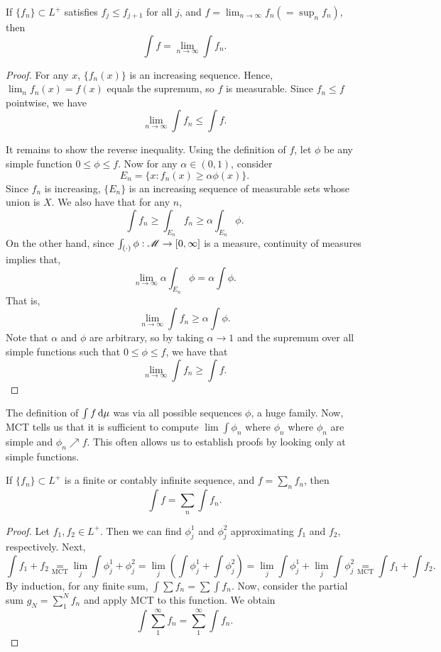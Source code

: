 \documentclass[12pt]{article} %
\begin{document}
\begin{theorem}
    If $\{f_n\} \subset L^+$ satisfies $f_j \leq f_{j+1}$ for all $j$, and $f = \lim_{n \to \infty} f_n (= \sup_n f_n)$, then \[\int f = \lim_{n \to \infty} \int f_n.\]
\end{theorem}

\begin{proof}
    For any $x$, $\{f_n(x)\}$ is an increasing sequence. Hence, $\lim_n f_n(x) = f(x)$ equals the supremum, so $f$ is measurable. Since $f_n \leq f$ pointwise, we have \[\lim_{n \to \infty} \int f_n \leq \int f.\]

    It remains to show the reverse inequality. Using the definition of $f$, let $\phi$ be any simple function $0 \leq \phi \leq f$. Now for any $\alpha \in (0,1)$, consider \[E_n = \{x : f_n(x) \geq \alpha \phi(x)\} .\] Since $f_n$ is increasing, $\{E_n\}$ is an increasing sequence of measurable sets whose union is $X$. We also have that for any $n$, \[\int f_n \geq \int_{E_n} f_n \geq \alpha \int_{E_n} \phi.\] On the other hand, since $\int_{(\cdot)}\phi : \mathscr{M} \to [0,\infty]$ is a measure, continuity of measures implies that, \[\lim_{n \to \infty} \alpha \int_{E_n} \phi = \alpha \int \phi.\] That is, \[\lim_{n \to \infty} \int f_n \geq \alpha \int \phi.\] Note that $\alpha$ and $\phi$ are arbitrary, so by taking $\alpha \to 1$ and the supremum over all simple functions such that $0 \leq \phi \leq f$, we have that \[\lim_{n \to \infty} \int f_n \geq \int f.\]
\end{proof}

\begin{remark}
    The definition of $\int f \, \mathrm{d} \mu$ was via all possible sequences $\phi$, a huge family. Now, MCT tells us that it is sufficient to compute $\lim \int \phi_n$ where $\phi_n$ where $\phi_n$ are simple and $\phi_n \nearrow f$. This often allows us to establish proofs by looking only at simple functions.
\end{remark}

\begin{theorem}\label{thm:2.15}
    If $\{f_n\} \subset L^+$ is a finite or contably infinite sequence, and $f = \sum_n f_n$, then \[\int f = \sum_n \int f_n.\]
\end{theorem}

\begin{proof}
    Let $f_1, f_2 \in L^+$. Then we can find $\phi_j^1$ and $\phi_j^2$ approximating $f_1$ and $f_2$, respectively. Next, \[\int f_1 + f_2 \underset{\text{MCT}}{=} \lim_j \int \phi_j^1 + \phi_j^2 = \lim_j \left( \int \phi_j^1 + \int \phi_j^2 \right) = \lim_j \int \phi_j^1 + \lim_j \int \phi_j^2 \underset{\text{MCT}}{=} \int f_1 + \int f_2.\] By induction, for any finite sum, $\int \sum f_n = \sum \int f_n$. Now, consider the partial sum $g_N = \sum_1^N f_n$ and apply MCT to this function. We obtain \[\int \sum_1^\infty f_n = \sum_1^\infty \int f_n.\]
\end{proof}
\end{document}
